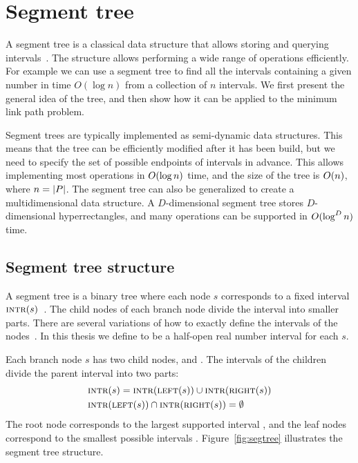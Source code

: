 \documentclass[english,gradu]{tktltiki2018}
\begin{document}
\section{Segment tree}\label{sec:segtree}

A segment tree is a classical data structure that allows storing and querying intervals~\cite{berg2008,wagner}.
The structure allows performing a wide range of operations efficiently.
For example we can use a segment tree to find all the intervals containing a given number in time $O(\log n)$ from a collection of $n$ intervals.
We first present the general idea of the tree, and then show how it can be applied to the minimum link path problem.

Segment trees are typically implemented as semi-dynamic data structures.
This means that the tree can be efficiently modified after it has been build, but we need to specify the set of possible endpoints \epts of intervals in advance.
This allows implementing most operations in $O(\log n)$ time, and the size of the tree is $O(n)$, where $n=\left |P\right |$.
The segment tree can also be generalized to create a multidimensional data structure.
A $D$-dimensional segment tree stores $D$-dimensional hyperrectangles, and many operations can be supported in $O(\log^D n)$ time.

\subsection{Segment tree structure}

A segment tree is a binary tree where each node $s$ corresponds to a fixed interval $\textsc{intr}(s)$~\cite{berg2008}.
The child nodes of each branch node divide the interval into smaller parts.
There are several variations of how to exactly define the intervals of the nodes~\cite{berg2008,kkkk}.
In this thesis we define  to be a half-open real number interval for each $s$.

Each branch node $s$ has two child nodes,  and .
The intervals of the children divide the parent interval into two parts:
\begin{align*}
&\textsc{intr}(s)=\textsc{intr}(\textsc{left}(s))\cup\textsc{intr}(\textsc{right}(s)) \\
&\textsc{intr}(\textsc{left}(s))\cap\textsc{intr}(\textsc{right}(s))=\emptyset
\end{align*}
The root node corresponds to the largest supported interval \range{\epts[1]}{\epts[\segsize]}, and the leaf nodes correspond to the smallest possible intervals \range{\epts[i]}{\epts[i+1]}.
Figure~\ref{fig:segtree} illustrates the segment tree structure.
\end{document}
